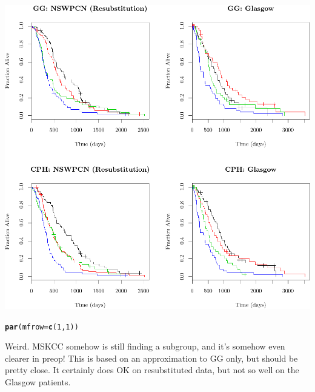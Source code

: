 \documentclass{article}\usepackage[]{graphicx}\usepackage[]{color}
\makeatletter
\def\maxwidth{ %
  \ifdim\Gin@nat@width>\linewidth
    \linewidth
  \else
    \Gin@nat@width
  \fi
}
\newcommand{\hlnum}[1]{\textcolor[rgb]{0.686,0.059,0.569}{#1}}%
\newcommand{\hlstd}[1]{\textcolor[rgb]{0.345,0.345,0.345}{#1}}%
\newcommand{\hlkwc}[1]{\textcolor[rgb]{0.333,0.667,0.333}{#1}}%
\newcommand{\hlkwd}[1]{\textcolor[rgb]{0.737,0.353,0.396}{\textbf{#1}}}%
\newenvironment{kframe}{%
 \def\at@end@of@kframe{}%
 \ifinner\ifhmode%
  \def\at@end@of@kframe{\end{minipage}}%
  \begin{minipage}{\columnwidth}%
 \fi\fi%
 \def\FrameCommand##1{\hskip\@totalleftmargin \hskip-\fboxsep
 \colorbox{shadecolor}{##1}\hskip-\fboxsep
     \hskip-\linewidth \hskip-\@totalleftmargin \hskip\columnwidth}%
 \MakeFramed {\advance\hsize-\width
   \@totalleftmargin\z@ \linewidth\hsize
   \@setminipage}}%
 {\par\unskip\endMakeFramed%
 \at@end@of@kframe}
\newenvironment{knitrout}{}{} %
\makeatother
\begin{document}
\begin{knitrout}
{\centering \includegraphics[width=\maxwidth]{figure/05-altman-4-1} 

}


\begin{kframe}\begin{alltt}
\hlkwd{par}\hlstd{(}\hlkwc{mfrow} \hlstd{=} \hlkwd{c}\hlstd{(}\hlnum{1}\hlstd{,} \hlnum{1}\hlstd{))}
\end{alltt}
\end{kframe}
\end{knitrout}
Weird.  MSKCC somehow is still finding a subgroup, and it's somehow even clearer in preop!  This is based on an approximation to GG only, but should be pretty close.  It certainly does OK on resubstituted data, but not so well on the Glasgow patients.
\end{document}
